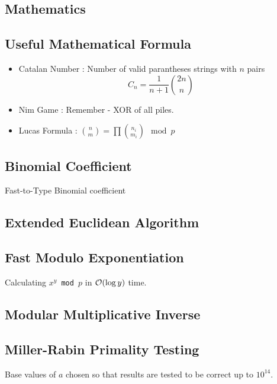 \documentclass[landscape,8pt]{article}
\begin{document}
\begin{multicols}{2}
\columnbreak
\section{Mathematics}
  \subsection{Useful Mathematical Formula}
    \begin{itemize}
      \item Catalan Number : Number of valid parantheses strings with $n$ pairs
      \[
        C_n = \frac{1}{n+1}\binom{2n}{n}
      \]
      \item Nim Game : Remember - XOR of all piles.
      \item Lucas Formula : $\binom{n}{m} = \prod \binom{n_i}{m_i} \mod p$
    \end{itemize}

  \subsection{Binomial Coefficient}
    Fast-to-Type Binomial coefficient

  \subsection{Extended Euclidean Algorithm}
    

  \subsection{Fast Modulo Exponentiation}
  Calculating \texttt{$x^y$ mod $p$} in $\order{\log y}$ time.
    

  \subsection{Modular Multiplicative Inverse}
    

  \subsection{Miller-Rabin Primality Testing}
  Base values of $a$ chosen so that results are tested to be correct up to $10^14$.
    


\end{multicols}
\end{document}
